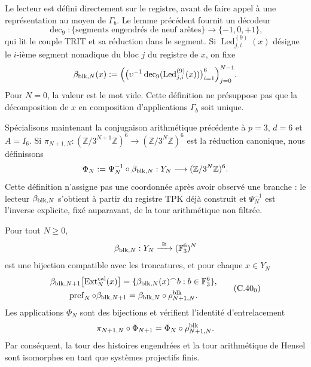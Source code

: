 Le lecteur est défini directement sur le registre, avant de faire appel à une représentation au moyen de \(\Gamma_b\). Le lemme précédent fournit un décodeur
\[
 \operatorname{dec}_9:\{\text{segments engendrés de neuf arêtes}\}
 \longrightarrow\{-1,0,+1\},
\]
qui lit le couple TRIT et sa réduction dans le segment. Si
\(\operatorname{Led}^{(9)}_{j,i}(x)\) désigne le \(i\)-ième segment nonadique
du bloc \(j\) du registre de \(x\), on fixe
\begin{equation}
 \beta_{{\rm blk},N}(x):=
 \Bigl(
   \bigl(\upsilon^{-1}\operatorname{dec}_9
          (\operatorname{Led}^{(9)}_{j,i}(x))\bigr)_{i=1}^{6}
 \Bigr)_{j=0}^{N-1}.
 \label{eq:lector-bloques-ch}
\end{equation}
Pour \(N=0\), la valeur est le mot vide. Cette définition ne présuppose pas que la décomposition de \(x\) en composition d'applications \(\Gamma_b\) soit unique.

Spécialisons maintenant la conjugaison arithmétique précédente à
\(p=3\), \(d=6\) et \(A=I_6\). Si
\(\pi_{N+1,N}:(\mathbb Z/3^{N+1}\mathbb Z)^6\to
(\mathbb Z/3^N\mathbb Z)^6\) est la réduction canonique, nous définissons
\begin{equation}
 \Phi_N:=\Psi_N^{-1}\circ\beta_{{\rm blk},N}:
 Y_N\longrightarrow(\mathbb Z/3^N\mathbb Z)^6.
 \label{eq:phi-hensel-bloques-ch}
\end{equation}
Cette définition n’assigne pas une coordonnée après avoir observé une branche : le
lecteur \(\beta_{{\rm blk},N}\) s’obtient à partir du registre TPK déjà construit et
\(\Psi_N^{-1}\) est l’inverse explicite, fixé auparavant, de la tour
arithmétique non filtrée.

\begin{proposition}
\label{prop:cobertura-729-seccion}
Pour tout \(N\geq0\),
\[
 \beta_{{\rm blk},N}:Y_N\xrightarrow{\ \cong\ }
 (\mathbb F_3^6)^N
\]
est une bijection compatible avec les troncatures, et pour chaque \(x\in Y_N\)
\[
 \begin{gathered}
 \beta_{{\rm blk},N+1}
 \bigl[\operatorname{Ext}^{\rm cal}_N(x)\bigr]
 =\{\beta_{{\rm blk},N}(x)^\frown b:
       b\in\mathbb F_3^6\},\\
 \operatorname{pref}_N\circ\beta_{{\rm blk},N+1}
 =\beta_{{\rm blk},N}\circ\rho^{\rm blk}_{N+1,N}.
 \end{gathered}
\tag{C.40$_0$}
\label{eq:cobertura-729-ch}
\]
Les applications \(\Phi_N\) sont des bijections et vérifient l’identité
d’entrelacement
\begin{equation}
 \pi_{N+1,N}\circ\Phi_{N+1}
 =\Phi_N\circ\rho^{\rm blk}_{N+1,N}.
 \label{eq:entrelazamiento-hensel-ext-ch}
\end{equation}
Par conséquent, la tour des histoires engendrées et la tour arithmétique de Hensel sont isomorphes en tant que systèmes projectifs finis.
\end{proposition}

